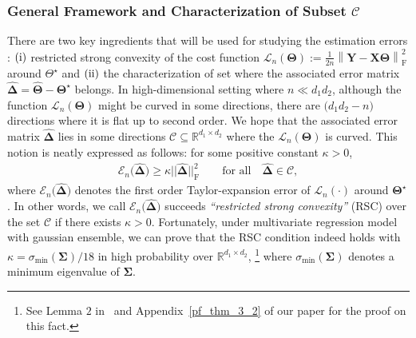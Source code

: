 \documentclass[alpha-refs]{wiley-article}
\newcommand{\RN}[1]{ \textup{\uppercase\expandafter{\romannumeral#1}} }
\begin{document}
\subsubsection{General Framework and Characterization of Subset $\mathcal{C}$} \label{GF}
There are two key ingredients that will be used for studying the estimation errors : $(\RN{1})$ restricted strong convexity of the cost function $\mathcal{L}_{n}(\boldsymbol{\Theta}):= \frac{1}{2n} \left\| \boldsymbol{Y}-\boldsymbol{X}\boldsymbol{\Theta} \right\|_{\text{F}}^{2}$ around $\Theta^\star$ and
$(\RN{2})$ the characterization of set where the associated error matrix $\boldsymbol{\widehat{\Delta}}=\widehat{\boldsymbol{\Theta}}-\boldsymbol{\Theta^{\star}}$ belongs. 
In high-dimensional setting where $n \ll d_{1}d_{2}$, although the function $\mathcal{L}_{n}(\boldsymbol{\Theta})$ might be curved in some directions, there are $\big(d_{1}d_{2}-n\big)$ directions where it is flat up to second order. 
We hope that the associated error matrix $\boldsymbol{\widehat{\Delta}}$ 
lies in some directions $\mathcal{C}\subseteq \mathbb{R}^{d_{1}\times d_{2}}$ where the $\mathcal{L}_{n}(\boldsymbol{\Theta})$ is curved. 
This notion is neatly expressed as follows: for some positive constant $\kappa>0$,
\begin{align} \label{RSC}
    \mathcal{E}_{n}\big(\boldsymbol{\widehat{\Delta}})\geq \kappa || \boldsymbol{\widehat{\Delta}} ||_{\text{F}}^{2} \qquad \text{for all} \quad \boldsymbol{\widehat{\Delta}}\in\mathcal{C},
\end{align}
where $\mathcal{E}_{n}\big(\boldsymbol{\widehat{\Delta}})$ denotes the first order Taylor-expansion error of $\mathcal{L}_{n}(\cdot)$ around $\boldsymbol{\Theta}^\star$.
In other words, we call $\mathcal{E}_{n}\big(\boldsymbol{\widehat{\Delta}})$ succeeds \textit{``restricted strong convexity''} (RSC) over the set $\mathcal{C}$ if there exists $\kappa>0$. 
Fortunately, under multivariate regression model with gaussian ensemble, we can prove that the RSC condition indeed holds with $\kappa=\sigma_{\text{min}}(\boldsymbol{\Sigma})/18$ in high probability over $\mathbb{R}^{d_{1} \times d_{2}}$,
\footnote{See Lemma $2$ in~\citet{negahban2011estimation} and Appendix~\ref{pf_thm_3_2} of our paper for the proof on this fact.} where $\sigma_{\text{min}}(\boldsymbol{\Sigma})$ denotes a minimum eigenvalue of $\boldsymbol{\Sigma}$.
\end{document}
